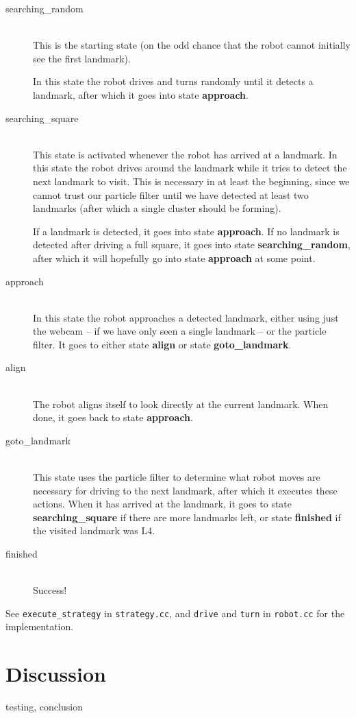 \documentclass[a4paper,12pt]{article}
\begin{document}
\begin{description}
\item[searching_random]\hfill\\
This is the starting state (on the odd chance that the robot cannot initially
see the first landmark).

In this state the robot drives and turns randomly until it detects a landmark,
after which it goes into state \textbf{approach}.


\item[searching_square]\hfill\\
This state is activated whenever the robot has arrived at a landmark.  In this
state the robot drives around the landmark while it tries to detect the next
landmark to visit.  This is necessary in at least the beginning, since we cannot
trust our particle filter until we have detected at least two landmarks (after
which a single cluster should be forming).

If a landmark is detected, it goes into state \textbf{approach}.  If no landmark
is detected after driving a full square, it goes into state
\textbf{searching_random}, after which it will hopefully go into state
\textbf{approach} at some point.


\item[approach]\hfill\\
In this state the robot approaches a detected landmark, either using just the
webcam -- if we have only seen a single landmark -- or the particle filter.  It
goes to either state \textbf{align} or state \textbf{goto_landmark}.


\item[align]\hfill\\
The robot aligns itself to look directly at the current landmark.  When done, it
goes back to state \textbf{approach}.


\item[goto_landmark]\hfill\\
This state uses the particle filter to determine what robot moves are necessary
for driving to the next landmark, after which it executes these actions.  When
it has arrived at the landmark, it goes to state \textbf{searching_square} if
there are more landmarks left, or state \textbf{finished} if the visited
landmark was L4.


\item[finished]\hfill\\
Success!

\end{description}

See \texttt{execute_strategy} in \texttt{strategy.cc}, and \texttt{drive} and
\texttt{turn} in \texttt{robot.cc} for the implementation.


\newpage
\section{Discussion}

testing, conclusion
\end{document}
